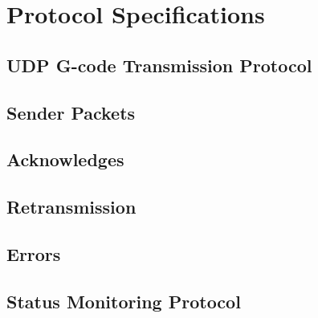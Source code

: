 \chapter{Protocol Specifications}
	
	\section{UDP G-code Transmission Protocol}
		
		\label{sec:udpSpec}
		
		\section{Sender Packets}
		
		\section{Acknowledges}
		
		\section{Retransmission}
		
		\section{Errors}
	
	\section{Status Monitoring Protocol}
		
		\label{sec:statusSpec}
